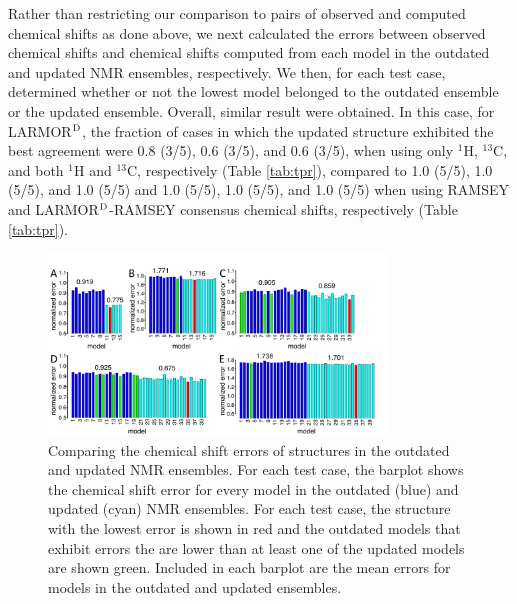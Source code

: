 \documentclass[fleqn,10pt]{wlscirep}
\begin{document}
Rather than restricting our comparison to pairs of observed and computed chemical shifts as done above, we next calculated the errors between observed chemical shifts and chemical shifts computed from each model in the outdated and updated NMR ensembles, respectively. We then, for each test case, determined whether or not the lowest model belonged to the outdated ensemble or the updated ensemble. Overall, similar result were obtained. In this case, for LARMOR$^{\rm D}$, the fraction of cases in which the updated structure exhibited the best agreement were 0.8 (3/5), 0.6 (3/5), and 0.6 (3/5), when using only $^{1}$H, $^{13}$C, and both $^{1}$H and $^{13}$C, respectively (Table \ref{tab:tpr}), compared to  1.0 (5/5), 1.0 (5/5), and 1.0 (5/5)  and 1.0 (5/5), 1.0 (5/5), and 1.0 (5/5) when using RAMSEY and LARMOR$^{\rm D}$-RAMSEY consensus chemical shifts, respectively (Table \ref{tab:tpr}).

\begin{figure}[h]
\begin{center}
\includegraphics[width=0.8\textwidth]{figure_error_bars}
\end{center}
\caption{Comparing the chemical shift errors of structures in the outdated and updated NMR ensembles. For each test case, the barplot shows the chemical shift error for every model in the outdated (blue) and updated (cyan) NMR ensembles. For each test case, the structure with the lowest error is shown in red and the outdated models that exhibit errors the are lower than at least one of the updated models are shown green. Included in each barplot are the mean errors for models in the outdated and updated ensembles.}
\label{fig:errorbars}
\end{figure}
\end{document}
